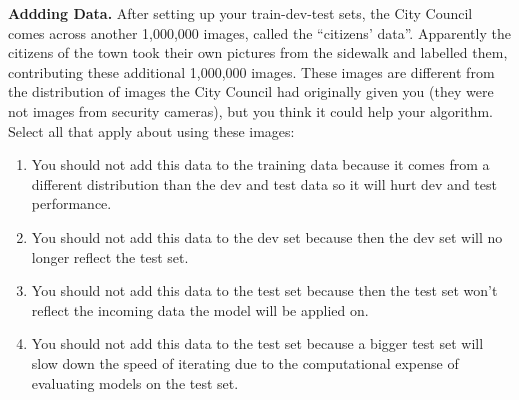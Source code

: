 \item {}
\textbf{Addding Data.}
After setting up your train-dev-test sets, the City Council comes across another 1,000,000 images, called the “citizens’ data”. Apparently the citizens of the town took their own pictures from the sidewalk and labelled them, contributing these additional 1,000,000 images. These images are different from the distribution of images the City Council had originally given you (they were not images from security cameras), but you think it could help your algorithm. Select all that apply about using these images:	

\begin{enumerate}[label=(\alph*)]
    \item You should not add this data to the training data because it comes from a different distribution than the dev and test data so it will hurt dev and test performance.
    \item You should not add this data to the dev set because then the dev set will no longer reflect the test set.
    \item You should not add this data to the test set because then the test set won’t reflect the incoming data the model will be applied on.
    \item You should not add this data to the test set because a bigger test set will slow down the speed of iterating due to the computational expense of evaluating models on the test set.
\end{enumerate} 
